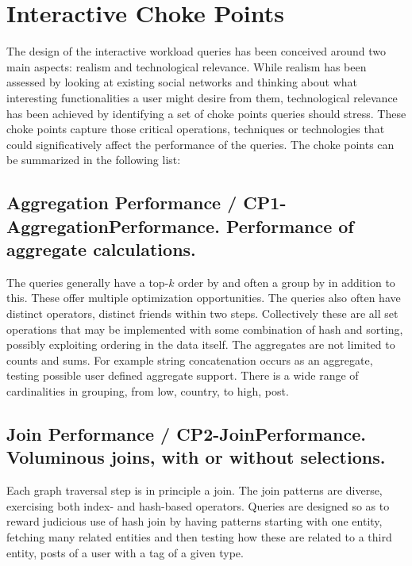 \section{Interactive Choke Points}


The design of the interactive workload queries has been conceived around two
main aspects: realism and technological relevance.  While realism has been
assessed by looking at existing social networks and thinking about what
interesting functionalities a user might desire from them, technological
relevance has been achieved by identifying a set of choke points queries should
stress.  These choke points capture those critical operations, techniques or
technologies that  could significatively affect the performance of the queries.
The choke points can be summarized in the following list:

\subsection*{Aggregation Performance / CP1-AggregationPerformance. Performance of aggregate calculations.}

The queries generally have a top-$k$ order by and often a group by in
addition to this.  These offer multiple optimization opportunities.
The queries also often have distinct operators, \ie distinct friends
within two steps.  Collectively these are all set operations that may
be implemented with some combination of hash and sorting, possibly
exploiting ordering in the data itself.  The aggregates are not
limited to counts and sums.  For example string concatenation occurs
as an aggregate, testing possible user defined aggregate support.
There is a wide range of cardinalities in grouping, from low, \eg country, to high, \eg post.

\subsection*{Join Performance / CP2-JoinPerformance. Voluminous joins, with or without selections.}

Each graph traversal step is in principle a join.  The join patterns are
diverse, exercising both index- and hash-based operators.   Queries are designed
so as to reward judicious use of hash join by having patterns starting with one
entity, fetching many related entities and then testing how these are related
to a third entity, \eg posts of a user with a tag of a given type.

